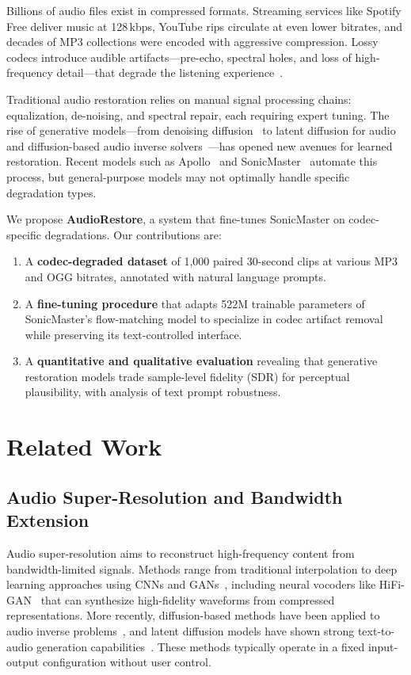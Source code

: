 \documentclass[conference]{IEEEtran}
\begin{document}
Billions of audio files exist in compressed formats. Streaming services like
Spotify Free deliver music at 128\,kbps, YouTube rips circulate at even lower
bitrates, and decades of MP3 collections were encoded with aggressive
compression. Lossy codecs introduce audible artifacts---pre-echo, spectral
holes, and loss of high-frequency detail---that degrade the listening
experience~\cite{li2025apollo}.

Traditional audio restoration relies on manual signal processing chains:
equalization, de-noising, and spectral repair, each requiring expert tuning.
The rise of generative models---from denoising diffusion~\cite{ho2020denoising}
to latent diffusion for audio~\cite{liu2023audioldm} and diffusion-based
audio inverse solvers~\cite{moliner2023diffusion}---has opened new avenues for
learned restoration. Recent models such as Apollo~\cite{li2025apollo} and
SonicMaster~\cite{melechovsky2025sonicmaster} automate this process, but
general-purpose models may not optimally handle specific degradation types.

We propose \textbf{AudioRestore}, a system that fine-tunes SonicMaster on
codec-specific degradations. Our contributions are:

\begin{enumerate}
    \item A \textbf{codec-degraded dataset} of 1{,}000 paired 30-second clips
    at various MP3 and OGG bitrates, annotated with natural language prompts.
    \item A \textbf{fine-tuning procedure} that adapts 522M trainable
    parameters of SonicMaster's flow-matching model to specialize in codec
    artifact removal while preserving its text-controlled interface.
    \item A \textbf{quantitative and qualitative evaluation} revealing that
    generative restoration models trade sample-level fidelity (SDR) for
    perceptual plausibility, with analysis of text prompt robustness.
\end{enumerate}

\section{Related Work}

\subsection{Audio Super-Resolution and Bandwidth Extension}
Audio super-resolution aims to reconstruct high-frequency content from
bandwidth-limited signals. Methods range from traditional interpolation to
deep learning approaches using CNNs and GANs~\cite{su2021bandwidth}, including
neural vocoders like HiFi-GAN~\cite{kong2020hifigan} that can synthesize
high-fidelity waveforms from compressed representations. More recently,
diffusion-based methods have been applied to audio inverse
problems~\cite{moliner2023diffusion}, and latent diffusion models have shown
strong text-to-audio generation capabilities~\cite{liu2023audioldm}. These
methods typically operate in a fixed input-output configuration without
user control.
\end{document}
